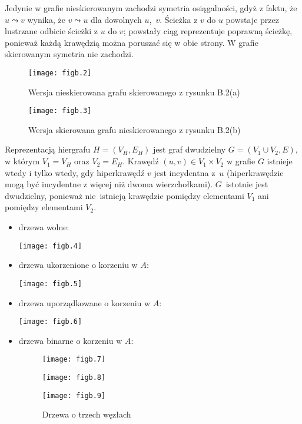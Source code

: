 Jedynie w grafie nieskierowanym zachodzi symetria osiągalności, gdyż z faktu, że $u\leadsto v$ wynika, że $v\leadsto u$ dla dowolnych $u$,~$v$. Ścieżka z $v$ do $u$ powstaje przez lustrzane odbicie ścieżki z $u$ do $v$; powstały ciąg reprezentuje poprawną ścieżkę, ponieważ każdą krawędzią można poruszać się w obie strony. W grafie skierowanym symetria nie zachodzi.

\exercise %
\begin{figure}[ht]
	\begin{center}
		\texttt{[image: figb.2]}
	\end{center}
	\caption{Wersja nieskierowana grafu skierowanego z rysunku B.2(a)}
\end{figure}
\begin{figure}[ht]
	\begin{center}
		\texttt{[image: figb.3]}
	\end{center}
	\caption{Wersja skierowana grafu nieskierowanego z rysunku B.2(b)}
\end{figure}

\exercise %
Reprezentacją hiergrafu $H=(V_H,E_H)$ jest graf dwudzielny $G=(V_1\cup V_2,E)$, w którym $V_1=V_H$ oraz $V_2=E_H$. Krawędź $(u,v)\in V_1\times V_2$ w grafie $G$ istnieje wtedy i tylko wtedy, gdy hiperkrawędź $v$ jest incydentna z~$u$ (hiperkrawędzie mogą być incydentne z więcej niż dwoma wierzchołkami). $G$~istotnie jest dwudzielny, ponieważ nie~istnieją krawędzie pomiędzy elementami $V_1$ ani pomiędzy elementami $V_2$.


\exercise %
\begin{itemize}
	\item drzewa wolne:
	\begin{center}
		\texttt{[image: figb.4]}
	\end{center}
	\item drzewa ukorzenione o korzeniu w $A$:
	\begin{center}
		\texttt{[image: figb.5]}
	\end{center}
	\item drzewa uporządkowane o korzeniu w $A$:
	\begin{center}
		\texttt{[image: figb.6]}
	\end{center}
	\item drzewa binarne o korzeniu w $A$:
	\begin{figure}[ht]
		\begin{center}
			\texttt{[image: figb.7]}
		\end{center}
		\begin{center}
			\texttt{[image: figb.8]}
		\end{center}
		\begin{center}
			\texttt{[image: figb.9]}
		\end{center}
		\caption{Drzewa o trzech węzłach}
	\end{figure}
\end{itemize}

